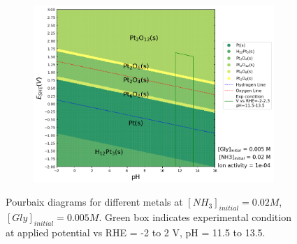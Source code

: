 \documentclass[journal=jacsat,manuscript=article]{achemso}
\begin{document}
\begin{figure}[htbp]
    \begin{subfigure}[b]{0.3\textwidth}
        \includegraphics[width=\textwidth]{Figures/pourbaix_diagrams/Pt-NH3-H2O_activity=1e-04_[NH3]=0.02M_[Gly]=0.005M_[CN]=0.png}
        \subcaption{}\label{fig:Pt_Pourbaix}
    \end{subfigure}

    \caption{Pourbaix diagrams for different metals at $[NH_3]_{initial}= 0.02M$, $[Gly]_{initial}=0.005M$. Green box indicates experimental condition at applied potential vs RHE = -2 to 2 V, pH = 11.5 to 13.5.}
    \label{fig:Pourbaix_NH3_Gly}
\end{figure}
\end{document}
